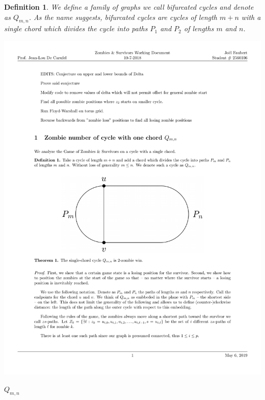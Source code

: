 \documentclass[letterpaper, 10pt]{article}
\begin{document}
\newtheorem{definition}{Definition}
\newtheorem{theorem}{Theorem}
\newtheorem{proposition}{Proposition}
\newtheorem{corollary}{Corollary}
\newtheorem{lemma}{Lemma}

\begin{definition}
 We define a family of graphs we call \emph{bifurcated cycles} and denote as $Q_{m,n}$.
 As the name suggests, bifurcated cycles are cycles of length $m+n$ with a single chord
 which divides the cycle into paths $P_1$ and $P_2$ of lengths $m$ and $n$.
\end{definition}

\begin{center}
 \includegraphics[scale=0.20]{Q_m_n}

 $Q_{m,n}$
\end{center}
\end{document}
